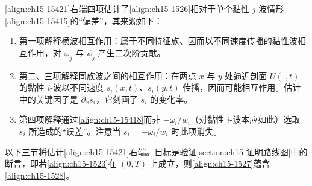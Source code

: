 \documentclass[../../main.tex]{subfiles}
\begin{document}
\eqref{align:ch15-15421}右端四项估计了\eqref{align:ch15-1526}相对于单个黏性 $j$-波情形\eqref{align:ch15-15415}的“偏差”，其来源如下：
\begin{enumerate}
\item\label{item:ch15-154-a} 第一项解释横波相互作用：属于不同特征族、因而以不同速度传播的黏性波相互作用，对 $\varphi_j$ 与 $\psi_j$ 产生二次阶贡献。
\item\label{item:ch15-154-b} 第二、三项解释同族波之间的相互作用：在两点 $x$ 与 $y$ 处逼近剖面 $U(\cdot,t)$ 的黏性 $i$-波以不同速度 $s_i(x,t)$、$s_i(y,t)$ 传播，因而可能相互作用。估计中的关键因子是 $\partial_xs_i$，它刻画了 $s_i$ 的变化率。
\item\label{item:ch15-154-c} 第四项解释通过\eqref{align:ch15-15418}而非 $-\omega_i/w_i$（对黏性 $i$-波本应如此）选取 $s_i$ 所造成的“误差”。注意当 $s_i=-\omega_i/w_i$ 时此项消失。
\end{enumerate}

以下三节将估计\eqref{align:ch15-15421}右端。目标是验证\cref{section:ch15-证明路线图}中的断言，即若\eqref{align:ch15-1523}在 $(0,T)$ 上成立，则\eqref{align:ch15-1527}蕴含\eqref{align:ch15-1528}。
\end{document}
